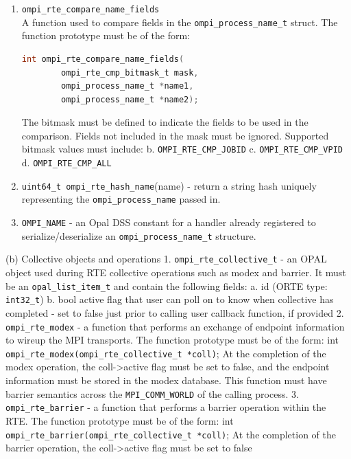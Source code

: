 \begin{enumerate}
\item \verb|ompi_rte_compare_name_fields|\\
  A function used to compare fields in the \verb|ompi_process_name_t| struct. The function prototype must be of the form:
  \begin{lstlisting}[language=C]
    int ompi_rte_compare_name_fields(
        ompi_rte_cmp_bitmask_t mask,
        ompi_process_name_t *name1,
        ompi_process_name_t *name2);
  \end{lstlisting}
                                         The bitmask must be defined to indicate the fields to be used
        in the comparison. Fields not included in the mask must be ignored.
        Supported bitmask values must include:
           b. \verb|OMPI_RTE_CMP_JOBID|
           c. \verb|OMPI_RTE_CMP_VPID|
           d. \verb|OMPI_RTE_CMP_ALL|
         \item \verb|uint64_t ompi_rte_hash_name|(name) - return a string hash uniquely representing the \verb|ompi_process_name| passed in.
       \item \verb|OMPI_NAME| - an Opal DSS constant for a handler already registered to serialize/deserialize an \verb|ompi_process_name_t| structure.

\end{enumerate}


\iffalse
         
 (b) Collective objects and operations
     1. \verb|ompi_rte_collective_t| - an OPAL object used during RTE collective operations such as modex and barrier. It must be an \verb|opal_list_item_t| and contain the following fields:
           a. id (ORTE type: \verb|int32_t|)
           b. bool active
              flag that user can poll on to know when collective
              has completed - set to false just prior to
              calling user callback function, if provided
     2. \verb|ompi_rte_modex| - a function that performs an exchange of endpoint information to wireup the MPI transports. The function prototype must be of the form:
        int \verb|ompi_rte_modex(ompi_rte_collective_t *coll)|;
        At the completion of the modex operation, the coll->active flag must be set to false, and the endpoint information must be stored in the modex database.
        This function must have barrier semantics across the \verb|MPI_COMM_WORLD| of the calling process.
     3. \verb|ompi_rte_barrier| - a function that performs a barrier operation within the RTE. The function prototype must be of the form:
        int \verb|ompi_rte_barrier(ompi_rte_collective_t *coll)|;
        At the completion of the barrier operation, the coll->active flag must be set to false

